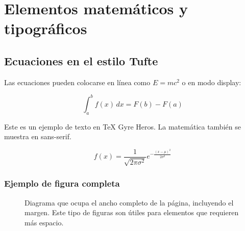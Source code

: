 
\chapter{Elementos matemáticos y tipográficos}

\section{Ecuaciones en el estilo Tufte}

Las ecuaciones pueden colocarse en línea como \(E = mc^2\) o en modo display:

\begin{equation}
\int_a^b f(x)\,dx = F(b) - F(a)
\end{equation}

Este es un ejemplo de texto en TeX Gyre Heros. La matemática también se muestra en sans-serif.

\[ f(x) = \frac{1}{\sqrt{2\pi\sigma^2}} e^{-\frac{(x-\mu)^2}{2\sigma^2}} \]

\subsection{Ejemplo de figura completa}

\begin{figure*}[ht]\centering
\caption{Diagrama que ocupa el ancho completo de la página, incluyendo el margen. Este tipo de figuras son útiles para elementos que requieren más espacio.}
\label{fig:diagrama-completo}
\end{figure*}



